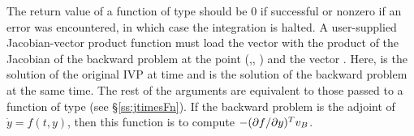 {  
  The return value of a function of type  should be
  $0$ if successful or nonzero if an error was encountered, in which case
  the integration is halted.
}
{
  A user-supplied Jacobian-vector product function must load the vector 
  with the product of the Jacobian of the backward problem 
  at the point (,, ) and the vector . 
  Here,  is the solution of the original IVP at time  and 
   is the solution of the backward problem at the same time.  
  The rest of the arguments are equivalent to those passed to a function of type
   (see \S\ref{ss:jtimesFn}).
  If the backward problem is the adjoint of ${\dot y} = f(t, y)$, then this 
  function is to compute $-(\partial f / \partial y)^T v_B$.
}

